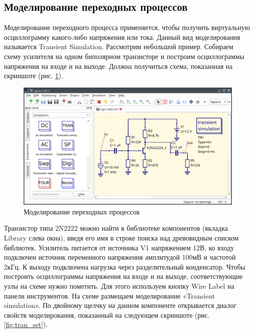 \documentclass[a4paper,12pt]{article}
\begin{document}
\subsection{Моделирование переходных процессов}

Моделирование переходного процесса применяется, чтобы получить виртуальную осциллограмму какого-либо напряжения или тока. Данный вид моделирования называется Transient Simulation. Рассмотрим небольшой пример. Собираем схему усилителя на одном биполярном транзисторе и построим осциллограммы напряжения на входе и на выходе. Должна получиться схема, показанная на скриншоте (рис. \ref{fig:tran}).

    \begin{figure}[!ht]
    \begin{center}
        \includegraphics[width=\textwidth]{img/bjt_tran.png}
    \end{center}
    \caption{Моделирование переходных процессов} \label{fig:tran}
    \end{figure}

Транзистор типа 2N2222 можно найти в библиотеке компонентов (вкладка Library слева окна), введя его имя в строке поиска над древовидным списком библиотек. Усилитель питается от источника V1 напряжением 12В, ко входу подключен источник переменного напряжения амплитудой 100мВ и частотой 2кГц. К выходу подключена нагрузка через разделительный конденсатор. Чтобы построить осциллограммы напряжения на входе и на выходе, соответствующие узлы на схеме нужно пометить. Для этого используем кнопку Wire Label на панели инструментов. На схеме размещаем моделирование «Transient simulation». По двойному щелчку на данном компоненте открывается диалог свойств моделирования, показанный на следующем скриншоте (рис. \ref{fig:tran_set}).
\end{document}
